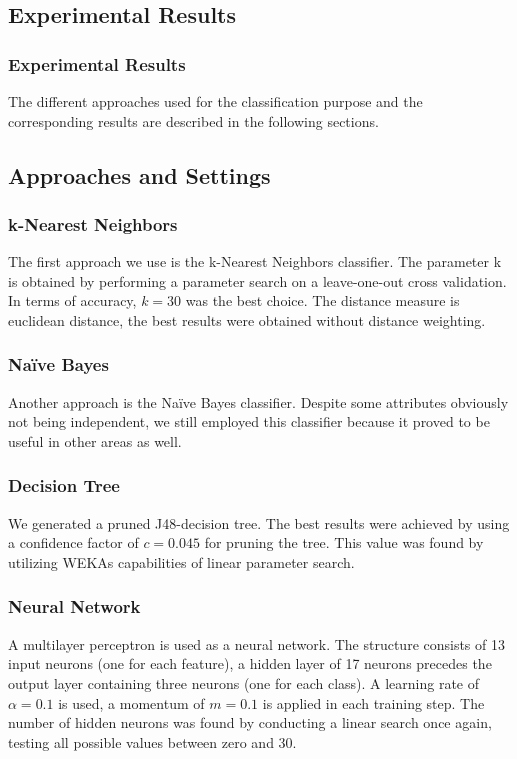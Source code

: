 \mode*
\begin{frame}
 	\section{Experimental Results}
 	\frametitle{Experimental Results}
\end{frame}

The different approaches used for the classification purpose and the corresponding results are described in the following sections. 
\subsection{Approaches and Settings}

\subsubsection*{k-Nearest Neighbors}
The first approach we use is the k-Nearest Neighbors classifier. The
parameter k is obtained by performing a parameter search on a
leave-one-out cross validation. In terms of accuracy, \(k=30\) was
the best choice. The distance measure is euclidean distance, the best
results were obtained without distance weighting.

\subsubsection*{Na\"ive Bayes}
Another approach is the Na\"ive Bayes classifier. Despite some
attributes obviously not being independent, we still employed this
classifier because it proved to be useful in other areas as well.

\subsubsection*{Decision Tree}
We generated a pruned J48-decision tree. The best results were
achieved by using a confidence factor of \(c=0.045\) for pruning the
tree. This value was found by utilizing WEKAs capabilities of linear
parameter search.

\subsubsection*{Neural Network}
A multilayer perceptron is used as a neural network. The structure
consists of 13 input neurons (one for each feature), a hidden layer
of 17 neurons precedes the output layer containing three neurons
(one for each class). A learning rate of \(\alpha=0.1\) is used, a momentum of
\(m=0.1\) is applied in each training step. The number of hidden
neurons was found by conducting a linear search once again, testing
all possible values between zero and 30.

